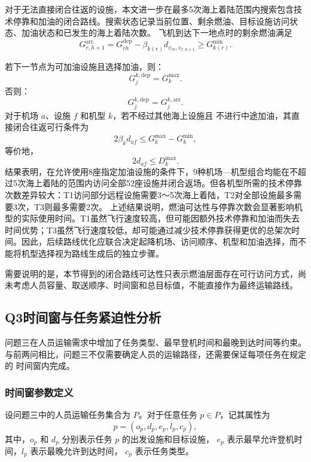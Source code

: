 \documentclass[UTF8,a4paper,zihao=5]{ctexart}
\begin{document}
对于无法直接闭合往返的设施，本文进一步在最多5次海上着陆范围内搜索包含技术停靠和加油的闭合路线。搜索状态记录当前位置、剩余燃油、目标设施访问状态、加油状态和已发生的海上着陆次数。
飞机到达下一地点时的剩余燃油满足
\begin{equation}
G_{r,h+1}^{\mathrm{arr}}
=
G_{rh}^{\mathrm{dep}}
-\beta_{k(r)}d_{v_{rh},v_{r,h+1}}
\ge G_{k(r)}^{\min}.
\end{equation}

若下一节点为可加油设施且选择加油，则：
\begin{equation}
  G_{j}^{k,\mathrm{dep}}=G_k^{\max}.
\end{equation}
否则：
\begin{equation}
  G_{j}^{k,\mathrm{dep}}=G_{j}^{k,\mathrm{arr}}.
\end{equation}
对于机场 $a$、设施 $f$ 和机型 $k$，若不经过其他海上设施且
不进行中途加油，其直接闭合往返可行条件为
\begin{equation}
2\beta_kd_{af}\le G_k^{\max}-G_k^{\min},
\end{equation}
等价地，
\begin{equation}
2d_{af}\le D_k^{\max}.
\end{equation}
结果表明，在允许使用8座指定加油设施的条件下，9种机场---机型组合均能在不超过5次海上着陆的范围内访问全部52座设施并闭合返场。但各机型所需的技术停靠次数差异较大：T1访问部分远程设施需要3～5次海上着陆，T2对全部设施最多需要3次，T3则最多需要2次。
上述结果说明，燃油可达性与停靠次数会显著影响机型的实际使用时间。T1虽然飞行速度较高，但可能因额外技术停靠和加油而失去时间优势；T3虽然飞行速度较低，却可能通过减少技术停靠获得更优的总架次时间。因此，后续路线优化应联合决定起降机场、访问顺序、机型和加油选择，而不能将机型选择视为路线生成后的独立步骤。

需要说明的是，本节得到的闭合路线可达性只表示燃油层面存在可行访问方式，尚未考虑人员容量、取送顺序、时间窗和总目标值，不能直接作为最终运输路线。
\subsection{Q3时间窗与任务紧迫性分析}
问题三在人员运输需求中增加了任务类型、最早登机时间和最晚到达时间等约束。
与前两问相比，问题三不仅需要确定人员的运输路径，还需要保证每项任务在规定的
时间窗内完成。

\subsubsection{时间窗参数定义}

设问题三中的人员运输任务集合为 $P$。对于任意任务
$p\in P$，记其属性为
\begin{equation}
    p=(o_p,d_p,e_p,l_p,c_p),
\end{equation}
其中，$o_p$ 和 $d_p$ 分别表示任务 $p$ 的出发设施和目标设施，
$e_p$ 表示最早允许登机时间，$l_p$ 表示最晚允许到达时间，
$c_p$ 表示任务类型。
\end{document}
